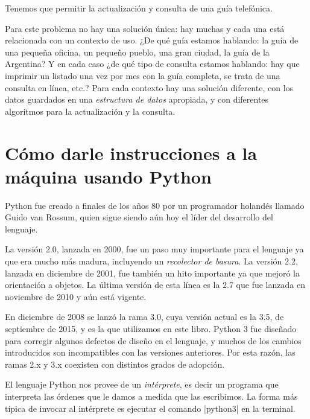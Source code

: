 \begin{problemac}

Tenemos que permitir la actualización y consulta de una guía
telefónica.

\end{problemac}

Para este problema no hay una solución única: hay muchas y cada
una está relacionada con un contexto de uso. ¿De qué guía estamos
hablando: la guía de una pequeña oficina, un pequeño pueblo, una
gran ciudad, la guía de la Argentina? Y en cada caso ¿de qué tipo
de consulta estamos hablando: hay que imprimir un listado una vez
por mes con la guía completa, se trata de una consulta en línea,
etc.? Para cada contexto hay una solución diferente, con los datos
guardados en una \emph{estructura de datos} apropiada, y con
diferentes algoritmos para la actualización y la consulta.

%
%

\section{Cómo darle instrucciones a la máquina usando Python}

\begin{sabias_que}
Python fue creado a finales de los años 80 por un programador holandés
llamado Guido van Rossum, quien sigue siendo aún hoy el líder del
desarrollo del lenguaje.

La versión 2.0, lanzada en 2000, fue un paso muy importante para el
lenguaje ya que era mucho más madura, incluyendo un \textit{recolector de
basura}.  La versión 2.2, lanzada en diciembre de 2001, fue también un hito
importante ya que mejoró la orientación a objetos.  La última versión de
esta línea es la 2.7 que fue lanzada en noviembre de 2010 y aún está vigente.

En diciembre de 2008 se lanzó la rama 3.0, cuya versión actual es la 3.5, de
septiembre de 2015, y es la que utilizamos en este libro. Python 3 fue diseñado
para corregir algunos defectos de diseño en el lenguaje, y muchos de los
cambios introducidos son incompatibles con las versiones anteriores. Por esta
razón, las ramas 2.x y 3.x coexisten con distintos grados de adopción.
\end{sabias_que}

El lenguaje Python nos provee de un \emph{intérprete}, es decir un programa que
interpreta las órdenes que le damos a medida que las escribimos. La forma más
típica de invocar al intérprete es ejecutar el comando |python3| en
la terminal.

